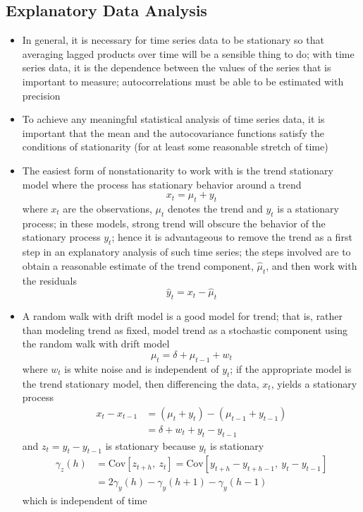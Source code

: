 \documentclass[12pt]{article}
\newcommand{\cov}[2]{\text{Cov}\left[#1, ~#2\right]}
\begin{document}
\subsection{Explanatory Data Analysis}
\begin{itemize}
\item In general, it is necessary for time series data to be stationary so that averaging lagged products over time will be a sensible thing to do; with time series data, it is the dependence between the values of the series that is important to measure; autocorrelations must be able to be estimated with precision 
\item To achieve any meaningful statistical analysis of time series data, it is important that the mean and the autocovariance functions satisfy the conditions of stationarity (for at least some reasonable stretch of time)
\item The easiest form of nonstationarity to work with is the trend stationary model where the process has stationary behavior around a trend $$ x_t = \mu_t + y_t $$ where $x_t$ are the observations, $\mu_t$ denotes the trend and $y_t$ is a stationary process; in these models, strong trend will obscure the behavior of the stationary process $y_t$; hence it is advantageous to remove the trend as a first step in an explanatory analysis of such time series; the steps involved are to obtain a reasonable estimate of the trend component, $\hat{\mu}_t$, and then work with the residuals $$ \hat{y}_t = x_t - \hat{\mu}_t $$  
\item A random walk with drift model is a good model for trend; that is, rather than modeling trend as fixed, model trend as a stochastic component using the random walk with drift model $$ \mu_t = \delta + \mu_{t-1} + w_t$$ where $w_t$ is white noise and is independent of $y_t$; if the appropriate model is the trend stationary model, then differencing the data, $x_t$, yields a stationary process
$$ \begin{aligned} x_t - x_{t-1} &= (\mu_t + y_t) - (\mu_{t-1} + y_{t-1}) \\ &= \delta + w_t + y_t - y_{t-1} \end{aligned} $$ and $z_t = y_t - y_{t-1}$ is stationary because $y_t$ is stationary 
$$ \begin{aligned} \gamma_z(h) &= \cov{z_{t+h}}{z_t} = \cov{y_{t+h} - y_{t+h-1}}{y_t - y_{t-1}} \\ &= 2\gamma_y(h) - \gamma_y(h+1) - \gamma_y(h-1) \end{aligned} $$ which is independent of time

\end{itemize}
\end{document}

